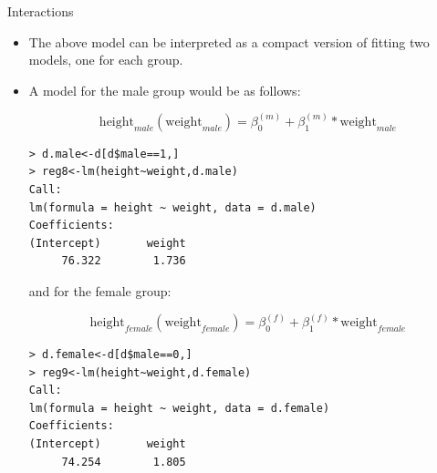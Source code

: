 \documentclass[handout]{beamer}
\begin{document}
\begin{frame}[fragile]{Interactions}
\scriptsize{ 
\begin{itemize}
\item The above model can be interpreted as a compact version of fitting two models, one for each group.

\item A model for the male group would be as follows:


  \begin{displaymath}
  \text{height}_{male}(\text{weight}_{male})=\beta_0^{(m)}+\beta_1^{(m)}*\text{weight}_{male}
 \end{displaymath}
 
 \begin{verbatim}
> d.male<-d[d$male==1,]
> reg8<-lm(height~weight,d.male)
Call:
lm(formula = height ~ weight, data = d.male)
Coefficients:
(Intercept)       weight  
     76.322        1.736  
\end{verbatim} 

and for the female group:
 
   \begin{displaymath}
  \text{height}_{female}(\text{weight}_{female})=\beta_0^{(f)}+\beta_1^{(f)}*\text{weight}_{female}
 \end{displaymath}


\begin{verbatim}
> d.female<-d[d$male==0,]     
> reg9<-lm(height~weight,d.female)
Call:
lm(formula = height ~ weight, data = d.female)
Coefficients:
(Intercept)       weight  
     74.254        1.805  
\end{verbatim} 

 
\end{itemize}




}
\end{frame}
\end{document}
